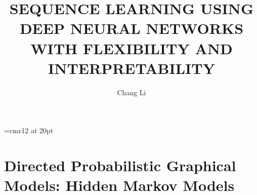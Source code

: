 \documentclass{StyFiles/usydthesis}
\renewcommand{\thepage}{\roman{page}}
\begin{document}
\singlespacing
{}  %
\renewcommand{\thepage}{\roman{page}}	
\font\myfont=cmr12 at 20pt 
\title{{\myfont\bf SEQUENCE LEARNING USING DEEP NEURAL NETWORKS WITH FLEXIBILITY AND INTERPRETABILITY}}
\author{Chang Li}
\def\thisauthor{Chang Li}
\def\degree{Doctor of Philosophy}
\def\department{School of Computer Science \\ Faculty of Engineering}
\def\mydegrees{Doctor of Philosophy (Ph.D.)}
\def\supervisor{Dacheng Tao}
\def\assocsupervisora{Dongjin Song}
\maketitle

\onehalfspacing
\pagestyle{empty}


\pagestyle{empty}

\pagestyle{empty}


\pagestyle{empty}


\pagestyle{headings}


\pagestyle{headings}
\tableofcontents
\listoffigures
\listoftables

\setcounter{page}{1}  %



\mainmatter


\part{Directed Probabilistic Graphical Models: Hidden Markov
  Models}
\label{part:1}


\end{document}
